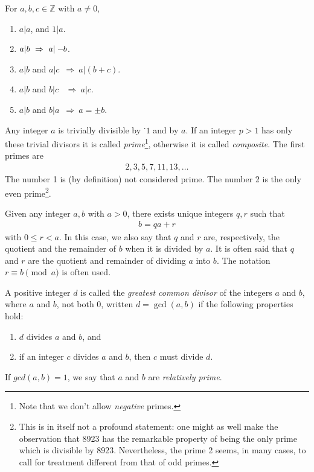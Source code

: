 \documentclass[a4paper, 12pt]{book} %
\begin{document}
\begin{theorem}
    For $a, b, c \in \mathbb{Z}$ with $a \neq 0$,
    \begin{enumerate}
        \item $a|a$, and $1|a$.
        \item $a|b~\Rightarrow~a|-\hspace{-1mm}b$.
        \item $a|b$ and $a|c$~$\Rightarrow~a|(b+c)$.
        \item $a|b$ and $b|c$ ~$\Rightarrow~a|c$.
        \item $a|b$ and $b|a$~$\Rightarrow~a = \pm b$.
    \end{enumerate}
\end{theorem}

Any integer $a$ is trivially divisible by ˙$1$ and by $a$. If an integer $p > 1$  has only these trivial divisors it is called \emph{prime}\footnote{Note that we don't allow \emph{negative} primes.}, otherwise it is called \emph{composite}. The first  primes are 
\begin{align}
    2, 3, 5, 7, 11, 13, \ldots
\end{align}
The number 1 is (by definition) not considered prime. The number 2 is the only even prime\footnote{This is in itself not a profound statement: one might as well make the observation that 8923 has the remarkable property of being the only prime which is divisible by 8923. Nevertheless, the prime 2 seems, in many cases, to call for treatment different from that of odd primes.}.

\begin{theorem}
    Given any integer $a, b$ with $a > 0$, there exists unique integers $q, r$ such that 
    \begin{align}
        b = qa + r
    \end{align}
    with $0 \leq r < a$. In this case, we also say that $q$ and $r$ are, respectively, the quotient and the remainder of $b$ when it is divided by $a$. It is often said that $q$ and $r$ are the quotient and remainder of dividing $a$ into $b$. The notation $r \equiv b \pmod a$ is often used.
\end{theorem}


\begin{definition}
    A positive integer $d$ is called the \emph{greatest common divisor} of the integers $a$ and $b$, where $a$ and $b$, not both 0, written $d = \gcd(a, b)$ if the following properties hold:
    \begin{enumerate}
        \item $d$ divides $a$ and $b$, and
        \item if an integer $c$ divides $a$ and $b$, then $c$ must divide $d$.
    \end{enumerate}
    If $gcd(a, b) = 1$, we say that $a$ and $b$ are \emph{relatively prime}.
\end{definition}
\end{document}
